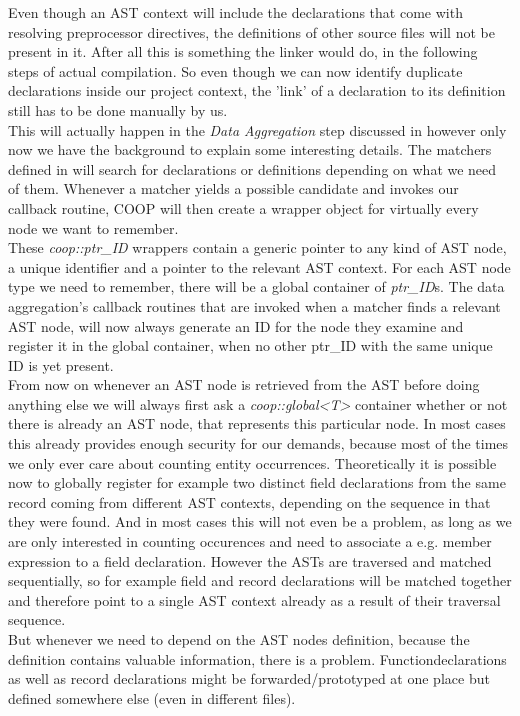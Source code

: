 Even though an AST context will include the declarations that come with resolving preprocessor directives, the definitions of other source files will not be present in it. After all this is something the linker would do, in the following steps of actual compilation. So even though we can now identify duplicate declarations inside our project context, the 'link' of a declaration to its definition still has to be done manually by us.\\
This will actually happen in the \textit{Data Aggregation} step discussed in  however only now we have the background to explain some interesting details. The matchers defined in  will search for declarations or definitions depending on what we need of them. Whenever a matcher yields a possible candidate and invokes our callback routine, COOP will then create a wrapper object for virtually every node we want to remember.\\
These \textit{coop::ptr\_ID} wrappers contain a generic pointer to any kind of AST node, a unique identifier and a pointer to the relevant AST context. For each AST node type we need to remember, there will be a global container of \textit{ptr\_ID}s. The data aggregation's callback routines that are invoked when a matcher finds a relevant AST node, will now always generate an ID for the node they examine and register it in the global container, when no other ptr\_ID with the same unique ID is yet present.\\
From now on whenever an AST node is retrieved from the AST before doing anything else we will always first ask a \textit{coop::global<T>} container whether or not there is already an AST node, that represents this particular node. In most cases this already provides enough security for our demands, because most of the times we only ever care about counting entity occurrences. Theoretically it is possible now to globally register for example two distinct field declarations from the same record coming from different AST contexts, depending on the sequence in that they were found. And in most cases this will not even be a problem, as long as we are only interested in counting occurences and need to associate a e.g. member expression to a field declaration. However the ASTs are traversed and matched sequentially, so for example field and record declarations will be matched together and therefore point to a single AST context already as a result of their traversal sequence.\\
But whenever we need to depend on the AST nodes definition, because the definition contains valuable information, there is a problem. Functiondeclarations as well as record declarations might be forwarded/prototyped at one place but defined somewhere else (even in different files).\\\\
